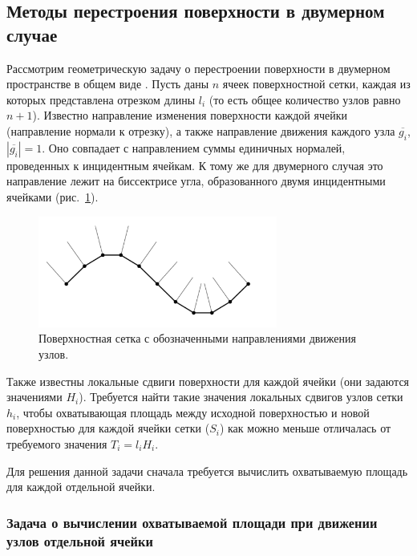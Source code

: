 \subsection{Методы перестроения поверхности в двумерном случае}

Рассмотрим геометрическую задачу о перестроении поверхности в двумерном пространстве в общем виде \cite{Rybakov2019Geo2D}.
Пусть даны $n$ ячеек поверхностной сетки, каждая из которых представлена отрезком длины $l_i$ (то есть общее количество узлов равно $n + 1$).
Известно направление изменения поверхности каждой ячейки (направление нормали к отрезку), а также направление движения каждого узла $\overline{g_i}$, $|\overline{g_i}| = 1$.
Оно совпадает с направлением суммы единичных нормалей, проведенных к инцидентным ячейкам.
К тому же для двумерного случая это направление лежит на биссектрисе угла, образованного двумя инцидентными ячейками \cite{Fortin2004Remesh2d} (рис.~\ref{fig:text_1_remesh_2d_grid_normals}).

\begin{figure}[h]
\onelinecaptionstrue
\centering
\includegraphics[width=0.7\textwidth]{pics/text_1_remesh_2d/grid_normals.pdf}
\caption{Поверхностная сетка с обозначенными направлениями движения узлов.}
\label{fig:text_1_remesh_2d_grid_normals}
\end{figure}

Также известны локальные сдвиги поверхности для каждой ячейки (они задаются значениями $H_i$).
Требуется найти такие значения локальных сдвигов узлов сетки $h_i$, чтобы охватывающая площадь между исходной поверхностью и новой поверхностью для каждой ячейки сетки ($S_i$) как можно меньше отличалась от требуемого значения $T_i = l_iH_i$.

Для решения данной задачи сначала требуется вычислить охватываемую площадь для каждой отдельной ячейки.

\subsubsection{Задача о вычислении охватываемой площади при движении узлов отдельной ячейки}

